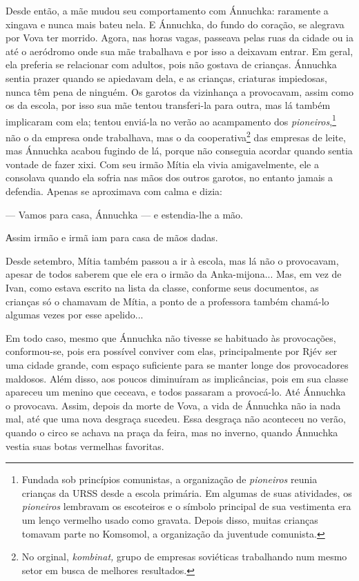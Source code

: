 Desde então, a mãe mudou seu comportamento com Ánnuchka: raramente a
xingava e nunca mais bateu nela. E Ánnuchka, do fundo do coração, se
alegrava por Vova ter morrido. Agora, nas horas vagas, passeava pelas
ruas da cidade ou ia até o aeródromo onde sua mãe trabalhava e por isso
a deixavam entrar. Em geral, ela preferia se relacionar com adultos,
pois não gostava de crianças. Ánnuchka sentia prazer quando se apiedavam
dela, e as crianças, criaturas impiedosas, nunca têm pena de ninguém. Os
garotos da vizinhança a provocavam, assim como os da escola, por isso
sua mãe tentou transferi-la para outra, mas lá também implicaram com
ela; tentou enviá-la no verão ao acampamento dos
\emph{pioneiros},\footnote{Fundada sob princípios comunistas, a
  organização de \emph{pioneiros} reunia crianças da URSS desde a escola
  primária. Em algumas de suas atividades, os \emph{pioneiros} lembravam
  os escoteiros e o símbolo principal de sua vestimenta era um lenço
  vermelho usado como gravata. Depois disso, muitas crianças tomavam
  parte no Komsomol, a organização da juventude comunista.} não o da
empresa onde trabalhava, mas o da cooperativa\footnote{No orginal,
  \emph{kombinat,} grupo de empresas soviéticas trabalhando num mesmo
  setor em busca de melhores resultados.} das empresas de leite, mas
Ánnuchka acabou fugindo de lá, porque não conseguia acordar quando
sentia vontade de fazer xixi. Com seu irmão Mítia ela vivia
amigavelmente, ele a consolava quando ela sofria nas mãos dos outros
garotos, no entanto jamais a defendia. Apenas se aproximava com calma e
dizia:

--- Vamos para casa, Ánnuchka --- e estendia-lhe a mão.

Аssim irmão e irmã iam para casa de mãos dadas.

Desde setembro, Mítia também passou a ir à escola, mas lá não o
provocavam, apesar de todos saberem que ele era o irmão da
Anka-mijona... Mas, em vez de Ivan, como estava escrito na lista da
classe, conforme seus documentos, as crianças só o chamavam de Mítia, a
ponto de a professora também chamá-lo algumas vezes por esse apelido...

Em todo caso, mesmo que Ánnuchka não tivesse se habituado às
provocações, conformou-se, pois era possível conviver com elas,
principalmente por Rjév ser uma cidade grande, com espaço suficiente
para se manter longe dos provocadores maldosos. Além disso, aos poucos
diminuíram as implicâncias, pois em sua classe apareceu um menino que
ceceava, e todos passaram a provocá-lo. Até Ánnuchka o provocava. Assim,
depois da morte de Vova, a vida de Ánnuchka não ia nada mal, até que uma
nova desgraça sucedeu. Essa desgraça não aconteceu no verão, quando o
circo se achava na praça da feira, mas no inverno, quando Ánnuchka
vestia suas botas vermelhas favoritas.

